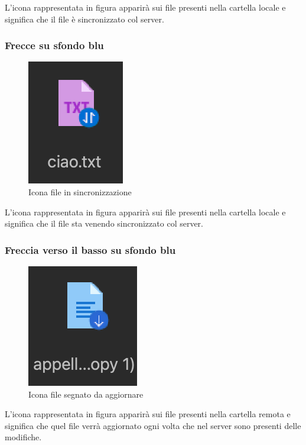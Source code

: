 L'icona rappresentata in figura apparirà sui file presenti nella cartella locale e significa che il file è sincronizzato col server.
\subsubsection{Frecce su sfondo blu}

\begin{figure}[H]
    \centering
    \includegraphics[scale = 1.6]{components/img/iconSync.png}
    \caption{Icona file in sincronizzazione}
    \label{fig:bluedownI}
\end{figure}

L'icona rappresentata in figura apparirà sui file presenti nella cartella locale e significa che il file sta venendo sincronizzato col server.

\subsubsection{Freccia verso il basso su sfondo blu}

\begin{figure}[H]
    \centering
    \includegraphics[scale = 0.8]{components/img/iconUpdate.png}
    \caption{Icona file segnato da aggiornare}
    \label{fig:greenI}
\end{figure}


L'icona rappresentata in figura apparirà sui file presenti nella cartella remota e significa che quel file verrà aggiornato ogni volta che nel server sono presenti delle modifiche.

